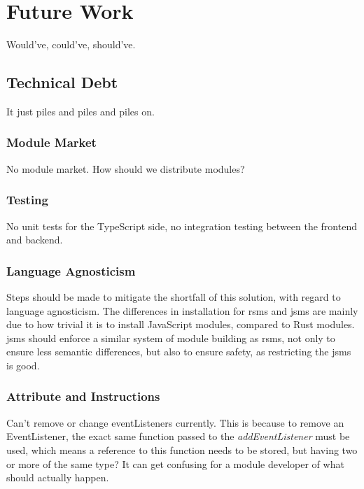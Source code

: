\chapter{Future Work}

Would've, could've, should've.


\section{Technical Debt}

It just piles and piles and piles on.

\subsection{Module Market}

No module market. How should we distribute modules?

\subsection{Testing}

No unit tests for the TypeScript side, no integration testing between the
frontend and backend.

\subsection{Language Agnosticism}

Steps should be made to mitigate the shortfall of this solution, with regard to
language agnosticism. The differences in installation for \gls{rsms} and
\gls{jsms} are mainly due to how trivial it is to install JavaScript modules,
compared to Rust modules. \gls{jsms} should enforce a similar system of module
building as \gls{rsms}, not only to ensure less semantic differences, but also
to ensure safety, as restricting the \gls{jsms} is good.

\subsection{Attribute and Instructions}

Can't remove or change eventListeners currently. This is because to remove an
EventListener, the exact same function passed to the \textit{addEventListener}
must be used, which means a reference to this function needs to be stored, but
having two or more of the same type? It can get confusing for a module developer
of what should actually happen.

